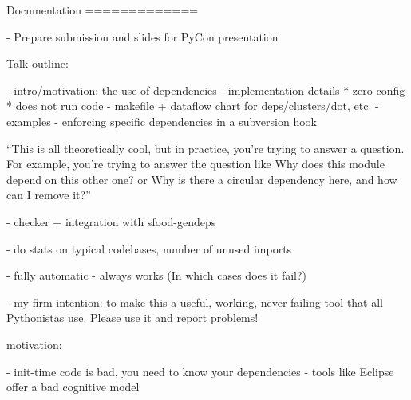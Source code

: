 

Documentation
=============

- Prepare submission and slides for PyCon presentation

  Talk outline:

  - intro/motivation: the use of dependencies
  - implementation details
    * zero config
    * does not run code
  - makefile + dataflow chart for deps/clusters/dot, etc.
  - examples
  - enforcing specific dependencies in a subversion hook

``This is all theoretically cool, but in practice, you're trying to
  answer a question.  For example, you're trying to answer the
  question like Why does this module depend on this other one? or Why
  is there a circular dependency here, and how can I remove it?''


- checker + integration with sfood-gendeps

  - do stats on typical codebases, number of unused imports

- fully automatic
- always works (In which cases does it fail?)


- my firm intention: to make this a useful, working, never failing
  tool that all Pythonistas use. Please use it and report problems!




motivation:

- init-time code is bad, you need to know your dependencies
- tools like Eclipse offer a bad cognitive model

